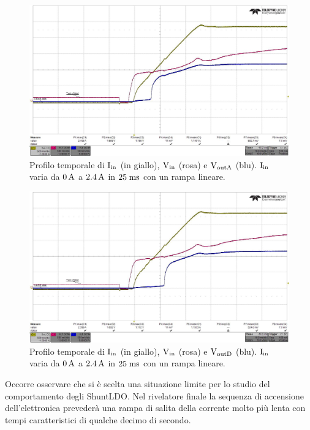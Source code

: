 \begin{figure}
\centering
\includegraphics[scale=.3]{Immagini/rd-powup-dir6}
\caption{Profilo temporale di $\mathrm{I_{in}}$ (in giallo), $\mathrm{V_{in}}$ (rosa) e $\mathrm{V_{outA}}$ (blu). $\mathrm{I_{in}}$ varia da $0\rm \, A$ a $2.4\rm \, A$ in $25\; \rm m \rm s$ con un rampa lineare.}
\label{rd-powup-dir6}
\end{figure}

\begin{figure}
\centering
\includegraphics[scale=.3]{Immagini/rd-powup-dir7}
\caption{Profilo temporale di $\mathrm{I_{in}}$ (in giallo), $\mathrm{V_{in}}$ (rosa) e $\mathrm{V_{outD}}$ (blu). $\mathrm{I_{in}}$ varia da $0\rm \, A$ a $2.4\rm \, A$ in $25\; \rm m \rm s$ con un rampa lineare.}
\label{rd-powup-dir7}
\end{figure}

Occorre osservare che si \`e scelta una situazione limite per lo studio del comportamento degli ShuntLDO. Nel rivelatore finale la sequenza di accensione dell'elettronica preveder\`a una rampa di salita della corrente molto pi\`u lenta con tempi caratteristici di qualche decimo di secondo.  

